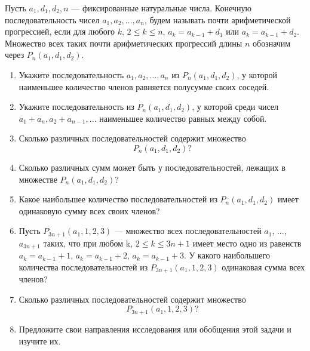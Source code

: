 Пусть $a_1, d_1, d_2, n$ — фиксированные натуральные числа. Конечную последовательность чисел $a_1, a_2, …, a_n$, будем называть почти арифметической прогрессией, если для любого $k$, $2 \leq k \leq n$, $a_k=a_{k-1}+d_1$ или $a_k=a_{k-1}+d_2$. Множество всех таких почти арифметических прогрессий длины $n$ обозначим через $P_n(a_1,d_1,d_2)$.

\begin{enumerate}
\item Укажите последовательность $a_1, a_2, \dots , a_n$ из $P_n(a_1,d_1,d_2)$, у которой наименьшее количество членов равняется полусумме своих соседей.
\item Укажите последовательность из $P_n(a_1,d_1,d_2)$, у которой среди чисел $a_1+a_n, a_2+a_{n-1},...$ наименьшее количество равных между собой.
\item Сколько различных последовательностей содержит множество
$$P_n(a_1,d_1,d_2)?$$
\item Сколько различных сумм может быть у последовательностей, лежащих в множестве $P_n(a_1,d_1,d_2)$?
\item Какое наибольшее количество последовательностей из $P_n(a_1,d_1,d_2)$ имеет одинаковую сумму всех своих членов?
\item Пусть $P_{3n+1}(a_1,1,2,3)$ — множество всех последовательностей $a_1$, ..., $a_{3n+1}$ таких, что при любом k, $2 \leq k \leq 3n+1$ имеет место одно из равенств $a_k=a_{k-1}+1$, $a_k=a_{k-1}+2$, $a_k=a_{k-1}+3$. У какого наибольшего количества последовательностей из $P_{3n+1}(a_1,1,2,3)$ одинаковая сумма всех членов?
\item Сколько различных последовательностей содержит множество
$$P_{3n+1}(a_1,1,2,3)?$$
\item Предложите свои направления исследования или обобщения этой задачи и изучите их.
\end{enumerate}

